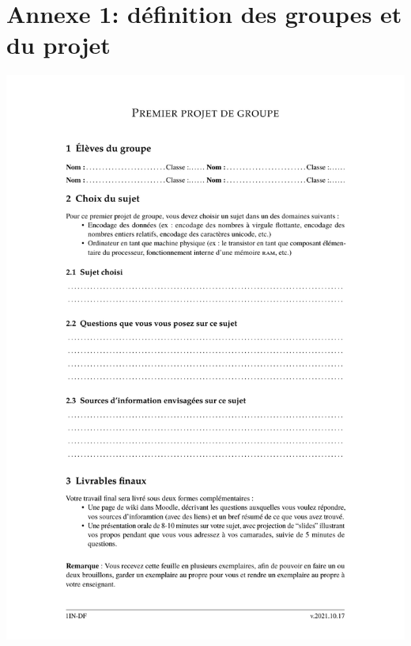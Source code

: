 \documentclass[11pt,bibliography=totoc]{scrartcl}
\begin{document}
\section*{Annexe 1: définition des groupes et du projet} %
\includegraphics[width=.95\textwidth]{projet1.pdf}
\end{document}
